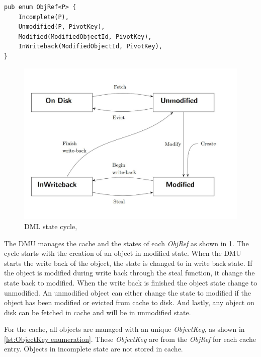 \documentclass[
	12pt,
	a4paper,
	abstract,
	bibliography=totoc,
	chapterprefix,
	headings=openright,
	numbers=endperiod,
	parskip=half,
	twoside,
]{scrreprt}
\begin{document}
\begin{lstlisting}[mathescape=true,caption={ObjRef enumeration, parameter P equals \&ObjectPointer<D>},
	label=lst:ObjRef enumeration]
pub enum ObjRef<P> {
    Incomplete(P),
    Unmodified(P, PivotKey),
    Modified(ModifiedObjectId, PivotKey),
    InWriteback(ModifiedObjectId, PivotKey),
}
\end{lstlisting}

\begin{figure}[ht]
	\centering
	\includegraphics[scale=0.4]{DML_state_cycle.jpg}
	\caption{DML state cycle, \cite{wiedemann2018modern}}
		\label{fig:DML state cycle}
\end{figure}


The DMU manages the cache and the states of each \emph{ObjRef} as shown in \ref{fig:DML state cycle}.
The cycle starts with the creation of an object in modified state. When the DMU starts the write back of the object, the state
is changed to in write back state.
If the object is modified during write back through the steal function, it change the state back to modified.
When the write back is finished the object state change to unmodified.
An unmodified object can either change the state to modified if the object has been modified or evicted from cache to disk.
And lastly, any object on disk can be fetched in cache and will be in unmodified state.

For the cache, all objects are managed with an unique \emph{ObjectKey}, as shown in \ref{lst:ObjectKey enumeration}.
These \emph{ObjectKey} are  from the \emph{ObjRef} for each cache entry.
Objects in incomplete state are not stored in cache.
\end{document}
